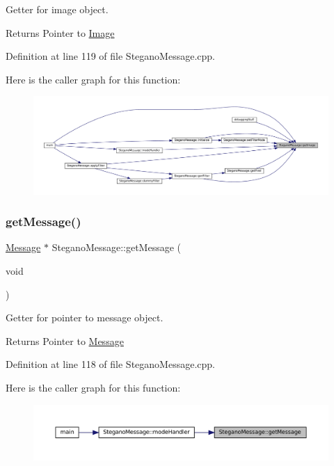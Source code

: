 Getter for image object. 

\begin{DoxyReturn}{Returns}
Pointer to \mbox{\hyperlink{classImage}{Image}} 
\end{DoxyReturn}


Definition at line 119 of file Stegano\+Message.\+cpp.

Here is the caller graph for this function\+:\nopagebreak
\begin{figure}[H]
\begin{center}
\leavevmode
\includegraphics[width=350pt]{classSteganoMessage_a2e3ad705a0219edfd2150f3f7931979c_icgraph}
\end{center}
\end{figure}
\mbox{\label{classSteganoMessage_ad29978e925056ad70dc5c45b1e1681eb}} 
\subsubsection{\texorpdfstring{getMessage()}{getMessage()}}
{\footnotesize\ttfamily \mbox{\hyperlink{classMessage}{Message}} $\ast$ Stegano\+Message\+::get\+Message (\begin{DoxyParamCaption}\item[{void}]{ }\end{DoxyParamCaption})}



Getter for pointer to message object. 

\begin{DoxyReturn}{Returns}
Pointer to \mbox{\hyperlink{classMessage}{Message}} 
\end{DoxyReturn}


Definition at line 118 of file Stegano\+Message.\+cpp.

Here is the caller graph for this function\+:\nopagebreak
\begin{figure}[H]
\begin{center}
\leavevmode
\includegraphics[width=350pt]{classSteganoMessage_ad29978e925056ad70dc5c45b1e1681eb_icgraph}
\end{center}
\end{figure}
\mbox{\label{classSteganoMessage_a7dc660e6d2c8f162636f789cfedde67e}} 
